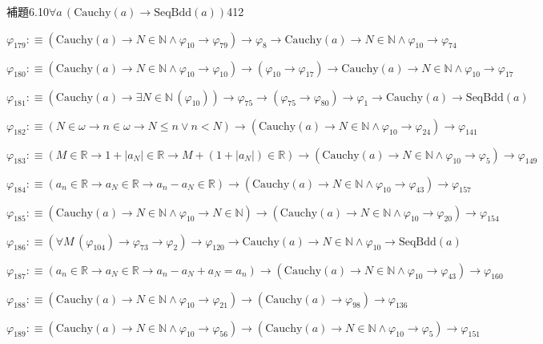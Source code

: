 \begin{fullproof}{補題6.10}{$\forall a\,(\mathrm{Cauchy}(a) \to \mathrm{SeqBdd}(a))$}{412}
\begin{abbrevlist}
\item $\varphi_{179} :\equiv (\mathrm{Cauchy}(a) \to N \in \mathbb{N} \land \varphi_{10} \to \varphi_{79}) \to \varphi_{8} \to \mathrm{Cauchy}(a) \to N \in \mathbb{N} \land \varphi_{10} \to \varphi_{74}$
\item $\varphi_{180} :\equiv (\mathrm{Cauchy}(a) \to N \in \mathbb{N} \land \varphi_{10} \to \varphi_{10}) \to (\varphi_{10} \to \varphi_{17}) \to \mathrm{Cauchy}(a) \to N \in \mathbb{N} \land \varphi_{10} \to \varphi_{17}$
\item $\varphi_{181} :\equiv (\mathrm{Cauchy}(a) \to \exists N \in \mathbb{N}\,(\varphi_{10})) \to \varphi_{75} \to (\varphi_{75} \to \varphi_{80}) \to \varphi_{1} \to \mathrm{Cauchy}(a) \to \mathrm{SeqBdd}(a)$
\item $\varphi_{182} :\equiv (N \in \omega \to n \in \omega \to N \leq n \lor n < N) \to (\mathrm{Cauchy}(a) \to N \in \mathbb{N} \land \varphi_{10} \to \varphi_{24}) \to \varphi_{141}$
\item $\varphi_{183} :\equiv (M \in \mathbb{R} \to 1 + \lvert a_{N} \rvert \in \mathbb{R} \to M + (1 + \lvert a_{N} \rvert) \in \mathbb{R}) \to (\mathrm{Cauchy}(a) \to N \in \mathbb{N} \land \varphi_{10} \to \varphi_{5}) \to \varphi_{149}$
\item $\varphi_{184} :\equiv (a_{n} \in \mathbb{R} \to a_{N} \in \mathbb{R} \to a_{n} - a_{N} \in \mathbb{R}) \to (\mathrm{Cauchy}(a) \to N \in \mathbb{N} \land \varphi_{10} \to \varphi_{43}) \to \varphi_{157}$
\item $\varphi_{185} :\equiv (\mathrm{Cauchy}(a) \to N \in \mathbb{N} \land \varphi_{10} \to N \in \mathbb{N}) \to (\mathrm{Cauchy}(a) \to N \in \mathbb{N} \land \varphi_{10} \to \varphi_{20}) \to \varphi_{154}$
\item $\varphi_{186} :\equiv (\forall M\,(\varphi_{104}) \to \varphi_{73} \to \varphi_{2}) \to \varphi_{120} \to \mathrm{Cauchy}(a) \to N \in \mathbb{N} \land \varphi_{10} \to \mathrm{SeqBdd}(a)$
\item $\varphi_{187} :\equiv (a_{n} \in \mathbb{R} \to a_{N} \in \mathbb{R} \to a_{n} - a_{N} + a_{N} = a_{n}) \to (\mathrm{Cauchy}(a) \to N \in \mathbb{N} \land \varphi_{10} \to \varphi_{43}) \to \varphi_{160}$
\item $\varphi_{188} :\equiv (\mathrm{Cauchy}(a) \to N \in \mathbb{N} \land \varphi_{10} \to \varphi_{21}) \to (\mathrm{Cauchy}(a) \to \varphi_{98}) \to \varphi_{136}$
\item $\varphi_{189} :\equiv (\mathrm{Cauchy}(a) \to N \in \mathbb{N} \land \varphi_{10} \to \varphi_{56}) \to (\mathrm{Cauchy}(a) \to N \in \mathbb{N} \land \varphi_{10} \to \varphi_{5}) \to \varphi_{151}$

\end{abbrevlist}
\end{fullproof}
